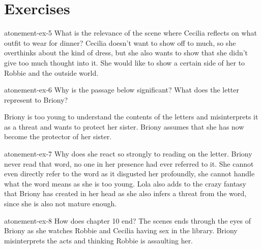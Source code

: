\documentclass[preview]{standalone}
\begin{document}
\section{Exercises}

\begin{snippetexercise}{atonement-ex-5}%
{What is the relevance of the scene where Cecilia reflects on what outfit to wear for dinner?}
Cecilia doesn't want to show off to much, so she overthinks about the kind of dress,
but she also wants to show that she didn't give too much thought into it.
She would like to show a certain side of her to Robbie and the outside world.
\end{snippetexercise}

\begin{snippetexercise}{atonement-ex-6}%
{Why is the passage below significant? What does the letter represent to Briony?}
\hspace{2cm}

Briony is too young to understand the contents of the letters and
misinterprets it as a threat and wants to protect her sister.
Briony assumes that she has now become the protector of her sister. 
\end{snippetexercise}

\begin{snippetexercise}{atonement-ex-7}%
{Why does she react so strongly to reading  on the letter.}
Briony never read that word, no one in her presence had ever referred to it.
She cannot even directly refer to the word as it disgusted her profoundly,
she cannot handle what the word means as she is too young.
Lola also adds to the crazy fantasy that Briony has created in her head
as she also infers a threat from the word, since she is also not mature enough.
\end{snippetexercise}

\begin{snippetexercise}{atonement-ex-8}%
{How does chapter 10 end?}
The scenes ends through the eyes of Briony as she watches Robbie and Cecilia
having sex in the library. Briony misinterprets the acts and thinking Robbie is assaulting her.
\end{snippetexercise}
\end{document}
